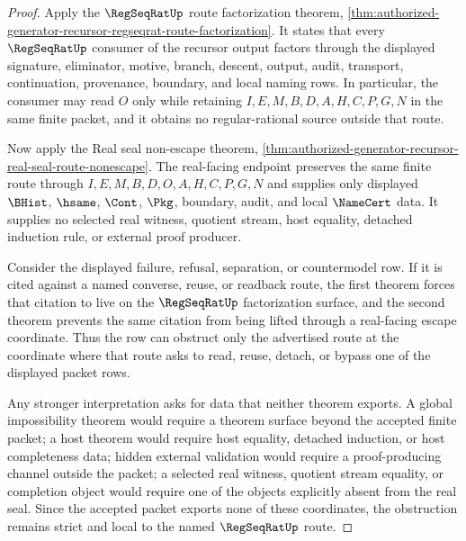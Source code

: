 \begin{proof}
Apply the $\RegSeqRatUp$ route factorization theorem, \autoref{thm:authorized-generator-recursor-regseqrat-route-factorization}. It states that every $\RegSeqRatUp$ consumer of the recursor output factors through the displayed signature, eliminator, motive, branch, descent, output, audit, transport, continuation, provenance, boundary, and local naming rows. In particular, the consumer may read $O$ only while retaining $I,E,M,B,D,A,H,C,P,G,N$ in the same finite packet, and it obtains no regular-rational source outside that route.

Now apply the Real seal non-escape theorem, \autoref{thm:authorized-generator-recursor-real-seal-route-nonescape}. The real-facing endpoint preserves the same finite route through $I,E,M,B,D,O,A,H,C,P,G,N$ and supplies only displayed $\BHist$, $\hsame$, $\Cont$, $\Pkg$, boundary, audit, and local $\NameCert$ data. It supplies no selected real witness, quotient stream, host equality, detached induction rule, or external proof producer.

Consider the displayed failure, refusal, separation, or countermodel row. If it is cited against a named converse, reuse, or readback route, the first theorem forces that citation to live on the $\RegSeqRatUp$ factorization surface, and the second theorem prevents the same citation from being lifted through a real-facing escape coordinate. Thus the row can obstruct only the advertised route at the coordinate where that route asks to read, reuse, detach, or bypass one of the displayed packet rows.

Any stronger interpretation asks for data that neither theorem exports. A global impossibility theorem would require a theorem surface beyond the accepted finite packet; a host theorem would require host equality, detached induction, or host completeness data; hidden external validation would require a proof-producing channel outside the packet; a selected real witness, quotient stream equality, or completion object would require one of the objects explicitly absent from the real seal. Since the accepted packet exports none of these coordinates, the obstruction remains strict and local to the named $\RegSeqRatUp$ route.
\end{proof}
